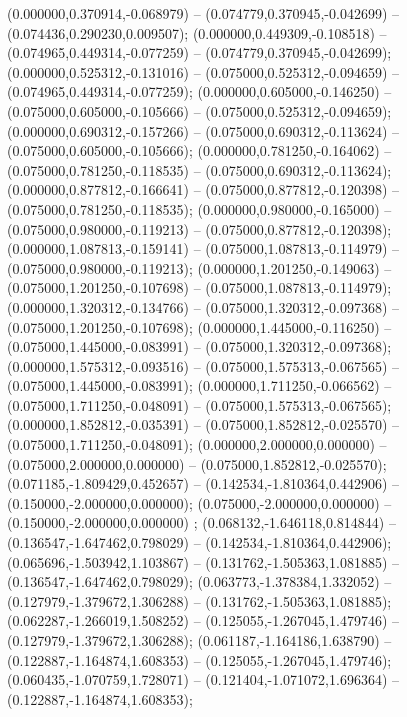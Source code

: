  (0.000000,0.370914,-0.068979) -- (0.074779,0.370945,-0.042699) -- (0.074436,0.290230,0.009507);
 (0.000000,0.449309,-0.108518) -- (0.074965,0.449314,-0.077259) -- (0.074779,0.370945,-0.042699);
 (0.000000,0.525312,-0.131016) -- (0.075000,0.525312,-0.094659) -- (0.074965,0.449314,-0.077259);
 (0.000000,0.605000,-0.146250) -- (0.075000,0.605000,-0.105666) -- (0.075000,0.525312,-0.094659);
 (0.000000,0.690312,-0.157266) -- (0.075000,0.690312,-0.113624) -- (0.075000,0.605000,-0.105666);
 (0.000000,0.781250,-0.164062) -- (0.075000,0.781250,-0.118535) -- (0.075000,0.690312,-0.113624);
 (0.000000,0.877812,-0.166641) -- (0.075000,0.877812,-0.120398) -- (0.075000,0.781250,-0.118535);
 (0.000000,0.980000,-0.165000) -- (0.075000,0.980000,-0.119213) -- (0.075000,0.877812,-0.120398);
 (0.000000,1.087813,-0.159141) -- (0.075000,1.087813,-0.114979) -- (0.075000,0.980000,-0.119213);
 (0.000000,1.201250,-0.149063) -- (0.075000,1.201250,-0.107698) -- (0.075000,1.087813,-0.114979);
 (0.000000,1.320312,-0.134766) -- (0.075000,1.320312,-0.097368) -- (0.075000,1.201250,-0.107698);
 (0.000000,1.445000,-0.116250) -- (0.075000,1.445000,-0.083991) -- (0.075000,1.320312,-0.097368);
 (0.000000,1.575312,-0.093516) -- (0.075000,1.575313,-0.067565) -- (0.075000,1.445000,-0.083991);
 (0.000000,1.711250,-0.066562) -- (0.075000,1.711250,-0.048091) -- (0.075000,1.575313,-0.067565);
 (0.000000,1.852812,-0.035391) -- (0.075000,1.852812,-0.025570) -- (0.075000,1.711250,-0.048091);
 (0.000000,2.000000,0.000000) -- (0.075000,2.000000,0.000000) -- (0.075000,1.852812,-0.025570);
 (0.071185,-1.809429,0.452657) -- (0.142534,-1.810364,0.442906) -- (0.150000,-2.000000,0.000000);
 (0.075000,-2.000000,0.000000) -- (0.150000,-2.000000,0.000000) ;
 (0.068132,-1.646118,0.814844) -- (0.136547,-1.647462,0.798029) -- (0.142534,-1.810364,0.442906);
 (0.065696,-1.503942,1.103867) -- (0.131762,-1.505363,1.081885) -- (0.136547,-1.647462,0.798029);
 (0.063773,-1.378384,1.332052) -- (0.127979,-1.379672,1.306288) -- (0.131762,-1.505363,1.081885);
 (0.062287,-1.266019,1.508252) -- (0.125055,-1.267045,1.479746) -- (0.127979,-1.379672,1.306288);
 (0.061187,-1.164186,1.638790) -- (0.122887,-1.164874,1.608353) -- (0.125055,-1.267045,1.479746);
 (0.060435,-1.070759,1.728071) -- (0.121404,-1.071072,1.696364) -- (0.122887,-1.164874,1.608353);
